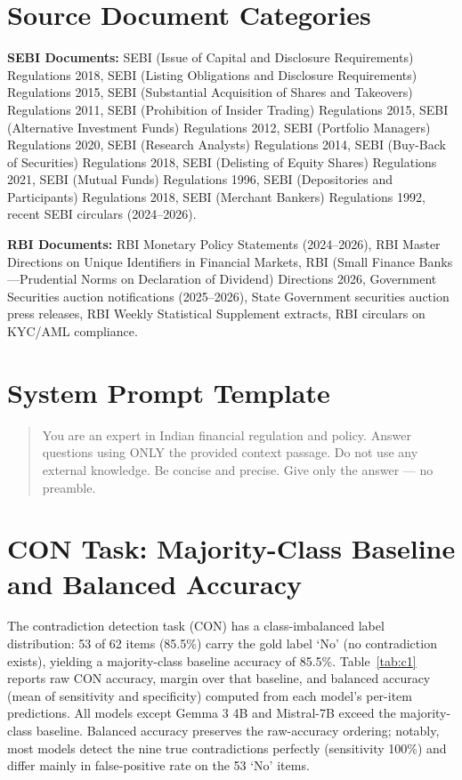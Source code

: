 \section{Source Document Categories}
\label{app:sourcedocs}

\textbf{SEBI Documents:} SEBI (Issue of Capital and Disclosure Requirements) Regulations 2018, SEBI (Listing Obligations and Disclosure Requirements) Regulations 2015, SEBI (Substantial Acquisition of Shares and Takeovers) Regulations 2011, SEBI (Prohibition of Insider Trading) Regulations 2015, SEBI (Alternative Investment Funds) Regulations 2012, SEBI (Portfolio Managers) Regulations 2020, SEBI (Research Analysts) Regulations 2014, SEBI (Buy-Back of Securities) Regulations 2018, SEBI (Delisting of Equity Shares) Regulations 2021, SEBI (Mutual Funds) Regulations 1996, SEBI (Depositories and Participants) Regulations 2018, SEBI (Merchant Bankers) Regulations 1992, recent SEBI circulars (2024--2026).

\textbf{RBI Documents:} RBI Monetary Policy Statements (2024--2026), RBI Master Directions on Unique Identifiers in Financial Markets, RBI (Small Finance Banks---Prudential Norms on Declaration of Dividend) Directions 2026, Government Securities auction notifications (2025--2026), State Government securities auction press releases, RBI Weekly Statistical Supplement extracts, RBI circulars on KYC/AML compliance.

\section{System Prompt Template}
\label{app:prompt}

\begin{quote}
\noindent You are an expert in Indian financial regulation and policy. Answer questions using ONLY the provided context passage. Do not use any external knowledge. Be concise and precise. Give only the answer --- no preamble.
\end{quote}

\section{CON Task: Majority-Class Baseline and Balanced Accuracy}
\label{app:con}

The contradiction detection task (CON) has a class-imbalanced label distribution: 53 of 62 items (85.5\%) carry the gold label `No' (no contradiction exists), yielding a majority-class baseline accuracy of 85.5\%. Table~\ref{tab:c1} reports raw CON accuracy, margin over that baseline, and balanced accuracy (mean of sensitivity and specificity) computed from each model's per-item predictions. All models except Gemma 3 4B and Mistral-7B exceed the majority-class baseline. Balanced accuracy preserves the raw-accuracy ordering; notably, most models detect the nine true contradictions perfectly (sensitivity 100\%) and differ mainly in false-positive rate on the 53 `No' items.

